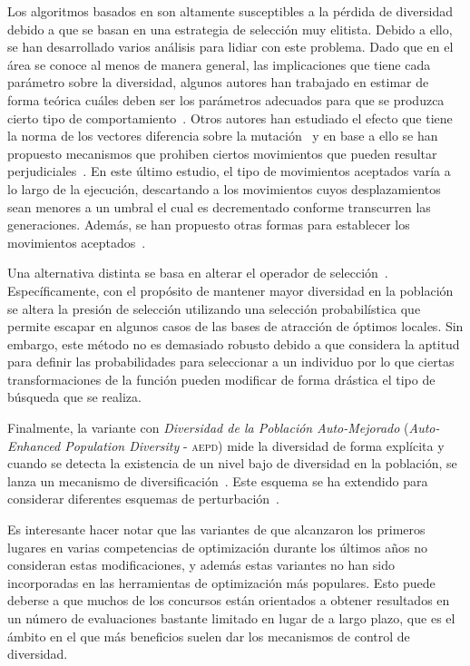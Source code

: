 Los algoritmos basados en \DE{} son altamente susceptibles a la pérdida de diversidad debido a que se basan en una estrategia de selección muy elitista.
%
Debido a ello, se han desarrollado varios análisis para lidiar con este problema.
%
Dado que en el área se conoce al menos de manera general, las implicaciones que tiene cada parámetro sobre la diversidad, algunos autores han trabajado
en estimar de forma teórica cuáles deben ser los parámetros adecuados para que se produzca cierto tipo de comportamiento~\cite{zaharie2003control}.
%
Otros autores han estudiado el efecto que tiene la norma de los vectores diferencia sobre la mutación~\cite{montgomery2009differential} y en base
a ello se han propuesto mecanismos que prohiben ciertos movimientos que pueden resultar perjudiciales~\cite{montgomery2012simple}.
%
En este último estudio, el tipo de movimientos aceptados varía a lo largo de la ejecución, descartando a los movimientos cuyos desplazamientos sean menores
a un umbral el cual es decrementado conforme transcurren las generaciones.
%
Además, se han propuesto otras formas para establecer los movimientos aceptados~\cite{bolufe2013differential}.

Una alternativa distinta se basa en alterar el operador de selección~\cite{sa2008exploration}.
%
Específicamente, con el propósito de mantener mayor diversidad en la población se altera la presión de selección utilizando una selección probabilística que
permite escapar en algunos casos de las bases de atracción de óptimos locales.
%
Sin embargo, este método no es demasiado robusto debido a que considera la aptitud para definir las probabilidades para seleccionar a un individuo por lo que ciertas 
transformaciones de la función pueden modificar de forma drástica el tipo de búsqueda que se realiza.

Finalmente, la variante \DE{} con \textit{Diversidad de la Población Auto-Mejorado} (\textit{Auto-Enhanced Population Diversity} - \textsc{aepd}) 
mide la diversidad de forma explícita y cuando se detecta la existencia de un nivel bajo de diversidad en la población, se 
lanza un mecanismo de diversificación~\cite{yang2015differential}.
%
Este esquema se ha extendido para considerar diferentes esquemas de perturbación~\cite{zhao2016differential}.

Es interesante hacer notar que las variantes de \DE{} que alcanzaron los primeros lugares en varias competencias de optimización durante los últimos años
no consideran estas modificaciones, y además estas variantes no han sido incorporadas en las herramientas de optimización más populares.
%
Esto puede deberse a que muchos de los concursos están orientados a obtener resultados en un número de evaluaciones bastante limitado en lugar de a largo plazo,
que es el ámbito en el que más beneficios suelen dar los mecanismos de control de diversidad.


